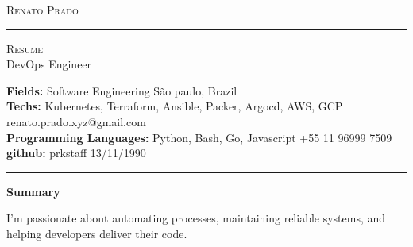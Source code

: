 \documentclass[10pt,A4]{article}
\newcommand{\cvsection}[1]
{
	\begin{center}
		\large\textcolor{sectcol}{\textbf{#1}}
	\end{center}
}
\newcommand{\metasection}[2]
{
\footnotesize{#2} \hspace*{\fill} \footnotesize{#1}\\[1pt]
}
\begin{document}
\pagestyle{fancy}








\vspace{-8pt}
\begin{center}
	\HUGE \textsc{Renato Prado} \textcolor{sectcol}{\rule[-1mm]{1mm}{0.9cm}} \textsc{Resume}\\[2pt]
	\small DevOps Engineer
\end{center}



\vspace{6pt}


\metasection{São paulo, Brazil}{\textbf{Fields:} Software Engineering}
\metasection{renato.prado.xyz@gmail.com}{\textbf{Techs:} Kubernetes, Terraform, Ansible, Packer, Argocd, AWS, GCP}
\metasection{+55 11 96999 7509}{\textbf{Programming Languages:} Python, Bash, Go, Javascript}
\metasection{13/11/1990}{\textbf{github:} prkstaff}
\vspace{-2pt}
\textcolor{softcol}{\hrule}
\vspace{6pt}

\normalsize

\vspace{-6pt}
\cvsection{Summary}
I'm passionate about automating processes, maintaining reliable systems, and helping developers deliver their code.\\
\end{document}
